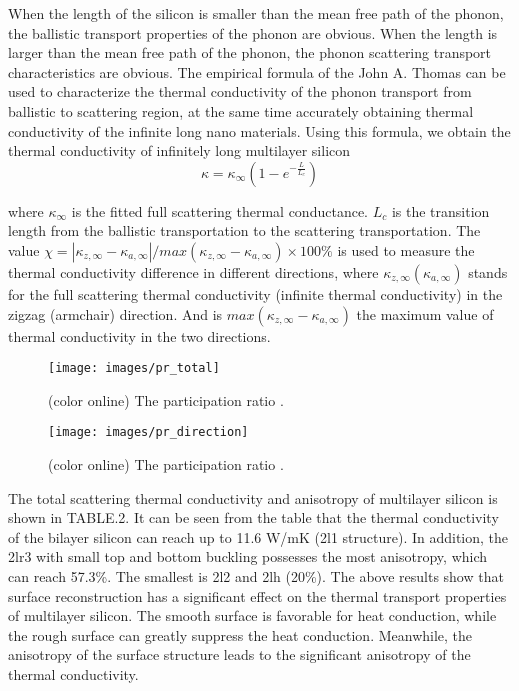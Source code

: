 \documentclass[%
 reprint,
 amsmath,amssymb,
 aps,
prb,
]{revtex4-1}
\begin{document}
When the length of the silicon is smaller than the mean free path of the phonon, the ballistic transport properties of the phonon are obvious. When the length is larger than the mean free path of the phonon, the phonon scattering transport characteristics are obvious. The empirical formula of the John A. Thomas\cite{Thomas2010} can be used to characterize the thermal conductivity of the phonon transport from ballistic to scattering region, at the same time accurately obtaining thermal conductivity of the infinite long nano materials. Using this formula, we obtain the thermal conductivity of infinitely long multilayer silicon
\begin{equation}
\kappa = \kappa_\infty (1-e^{-\frac{L}{L_c}})
\end{equation}

where $\kappa_\infty$ is the fitted full scattering thermal conductance. $L_c$ is the transition length from the ballistic transportation to the scattering transportation. The value $ \chi=|\kappa_{z,\infty}-\kappa_{a,\infty} |/max⁡(\kappa_{z,\infty}-\kappa_{a,\infty} ) \times 100 \%$ is used to measure the thermal conductivity difference in different directions, where $ \kappa_{z,\infty} (\kappa_{a,\infty})$ stands for the full scattering thermal conductivity (infinite thermal conductivity) in the zigzag (armchair) direction. And is $ max⁡(\kappa_{z,\infty}-\kappa_{a,\infty} ) $ the maximum value of thermal conductivity in the two directions. 

\begin{figure}[b]
\texttt{[image: images/pr\_total]}
\caption{\label{fig:pr_total} (color online) The participation ratio .}
\end{figure}

\begin{figure}[b]
\texttt{[image: images/pr\_direction]}
\caption{\label{fig:pr_direction} (color online) The participation ratio .}
\end{figure}

The total scattering thermal conductivity and anisotropy of multilayer silicon is shown in TABLE.2. It can be seen from the table that the thermal conductivity of the bilayer silicon can reach up to 11.6 W/mK (2l1 structure). In addition, the 2lr3 with small top and bottom buckling possesses the most anisotropy, which can reach 57.3\%. The smallest is 2l2 and 2lh (20\%). The above results show that surface reconstruction has a significant effect on the thermal transport properties of multilayer silicon. The smooth surface is favorable for heat conduction, while the rough surface can greatly suppress the heat conduction. Meanwhile, the anisotropy of the surface structure leads to the significant anisotropy of the thermal conductivity.
\end{document}
